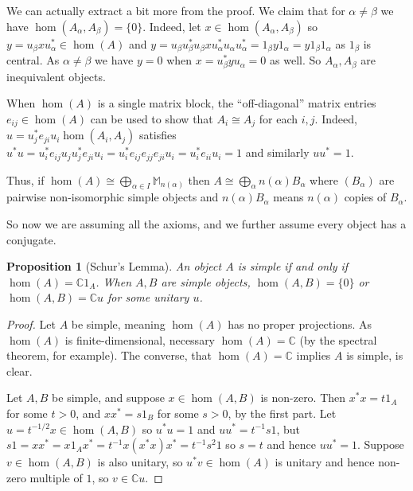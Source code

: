 \documentclass[a4paper,11pt]{article}
\theoremstyle{plain}
\newtheorem{proposition}{Proposition}[section]
\theoremstyle{remark}
\newenvironment{remark}
  {\pushQED{\qed}\renewcommand{\qedsymbol}{$\triangle$}\remarkx}
  {\popQED\endremarkx}
\begin{document}
\begin{remark}
We can actually extract a bit more from the proof.  We claim that for $\alpha\not=\beta$ we have $\hom(A_\alpha, A_\beta) = \{0\}$.  Indeed, let $x \in \hom(A_\alpha, A_\beta)$ so $y = u_\beta x u_\alpha^* \in \hom(A)$ and $y = u_\beta u_\beta^* u_\beta x u_\alpha^* u_\alpha u_\alpha^* = 1_\beta y 1_\alpha = y 1_\beta 1_\alpha$ as $1_\beta$ is central.  As $\alpha\not=\beta$ we have $y = 0$ when $x = u_\beta^* y u_\alpha = 0$ as well.  So $A_\alpha, A_\beta$ are inequivalent objects.

When $\hom(A)$ is a single matrix block, the ``off-diagonal'' matrix entries $e_{ij}\in\hom(A)$ can be used to show that $A_i \cong A_j$ for each $i,j$.  Indeed, $u = u_j^* e_{ji} u_i \hom(A_i, A_j)$ satisfies $u^*u = u_i^* e_{ij} u_j u_j^* e_{ji} u_i = u_i^* e_{ij} e_{jj} e_{ji} u_i = u_i^* e_{ii} u_i = 1$ and similarly $uu^*=1$.

Thus, if $\hom(A) \cong \bigoplus_{\alpha \in I} \mathbb M_{n(\alpha)}$ then $A \cong \bigoplus_\alpha n(\alpha) B_\alpha$ where $(B_\alpha)$ are pairwise non-isomorphic simple objects and $n(\alpha) B_\alpha$ means $n(\alpha)$ copies of $B_\alpha$.
\end{remark}

So now we are assuming all the axioms, and we further assume every object has a conjugate.  

\begin{proposition}[Schur's Lemma]
An object $A$ is simple if and only if $\hom(A) = \mathbb C1_A$.  When $A,B$ are simple objects, $\hom(A,B)=\{0\}$ or $\hom(A,B)=\mathbb C u$ for some unitary $u$.
\end{proposition}
\begin{proof}
Let $A$ be simple, meaning $\hom(A)$ has no proper projections.  As $\hom(A)$ is finite-dimensional, necessary $\hom(A) = \mathbb C$ (by the spectral theorem, for example).  The converse, that $\hom(A)=\mathbb C$ implies $A$ is simple, is clear.

Let $A,B$ be simple, and suppose $x \in \hom(A,B)$ is non-zero.  Then $x^*x = t 1_A$ for some $t>0$, and $xx^* = s1_B$ for some $s>0$, by the first part.  Let $u = t^{-1/2} x \in \hom(A,B)$ so $u^*u = 1$ and $uu^* = t^{-1}s 1$, but $s1 = xx^* = x 1_A x^* = t^{-1} x (x^*x) x^* = t^{-1} s^2 1$ so $s=t$ and hence $uu^*=1$.  Suppose $v\in\hom(A,B)$ is also unitary, so $u^*v \in \hom(A)$ is unitary and hence non-zero multiple of $1$, so $v \in \mathbb Cu$.
\end{proof}
\end{document}
